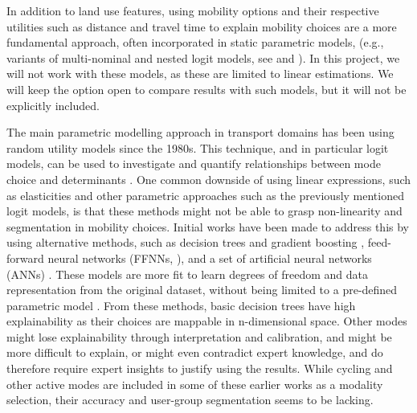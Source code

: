 \documentclass[sigconf, natbib=false, nonacm]{acmart}
\begin{document}
    
    In addition to land use features, using mobility options and their respective utilities such as distance and travel time to explain mobility choices are a more fundamental approach, often incorporated in static parametric models, (e.g., variants of multi-nominal and nested logit models, see \parencite{koppelman_self_2006} and \parencite{ortuzar_modelling_2011}). In this project, we will not work with these models, as these are limited to linear estimations. We will keep the option open to compare results with such models, but it will not be explicitly included. 

    The main parametric modelling approach in transport domains has been using random utility models since the 1980s. This technique, and in particular logit models, can be used to investigate and quantify relationships between mode choice and determinants \cite{lee_comparison_2018}. One common downside of using linear expressions, such as elasticities and other parametric approaches such as the previously mentioned logit models, is that these methods might not be able to grasp non-linearity and segmentation in mobility choices. Initial works have been made to address this by using alternative methods, such as decision trees and gradient boosting \parencite{ding_applying_2018}, feed-forward neural networks (FFNNs, \cite{bakri_inzichten_2023}), and a set of artificial neural networks (ANNs) \parencite{lee_comparison_2018}. These models are more fit to learn degrees of freedom and data representation from the original dataset, without being limited to a pre-defined parametric model \parencite{bakri_inzichten_2023}. From these methods, basic decision trees have high explainability as their choices are mappable in n-dimensional space. Other modes might lose explainability through interpretation and calibration, and might be more difficult to explain, or might even contradict expert knowledge, and do therefore require expert insights to justify using the results. While cycling and other active modes are included in some of these earlier works as a modality selection, their accuracy and user-group segmentation seems to be lacking. 
\end{document}
